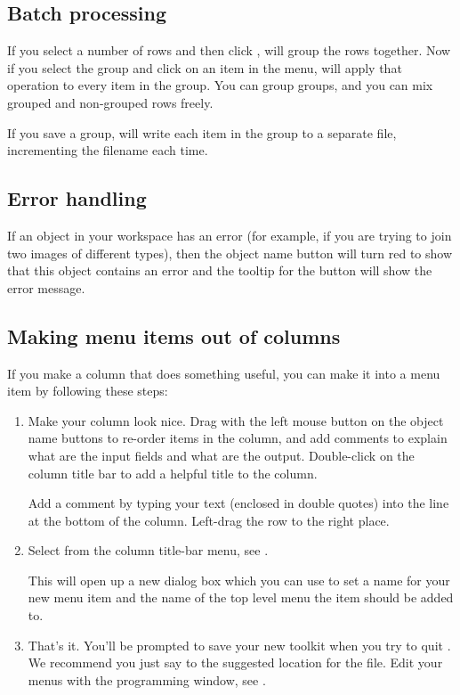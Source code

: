\subsection{Batch processing}

If you select a number of rows and then click , \nip{}
will group the rows together. Now if you select the group and click on an item
in the  menu, \nip{} will apply that operation to every item in
the group. You can group groups, and you can mix grouped and non-grouped rows
freely.

If you save a group, \nip{} will write each item in the group to a separate
file, incrementing the filename each time. 

\subsection{Error handling}

If an object in your workspace has an error (for example, if you are trying
to join two images of different types), then the object name button will
turn red to show that this object contains an error and the tooltip for the
button will show the error message.

\subsection{Making menu items out of columns}

If you make a column that does
something useful, you can make it into a menu item by following these steps:

\begin{enumerate}

\item
Make your column look nice. Drag with the left mouse button on the object
name buttons to re-order items in the column, and add comments to explain
what are the input fields and what are the output. Double-click on the column
title bar to add a helpful title to the column.

Add a comment by typing your text (enclosed in double quotes) into the line
at the bottom of the column. Left-drag the row to the right place.

\item
Select  from the 
column title-bar menu, see .

This will open up a new dialog box which you can use to set a name for
your new menu item and the name of the top level menu 
the item should be added to. 

\item
That's it. You'll be prompted to save your new toolkit when you try to
quit \nip{}. We recommend you just say  to the suggested location
for the file. Edit your menus with the programming window, see
.

\end{enumerate}

